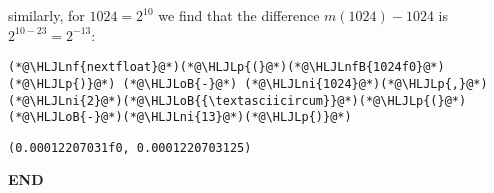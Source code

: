 \documentclass[12pt,a4paper]{article}
\newcommand{\HLJLnf}[1]{\textcolor[RGB]{66,102,213}{#1}}
\newcommand{\HLJLnfB}[1]{\textcolor[RGB]{59,151,46}{#1}}
\newcommand{\HLJLni}[1]{\textcolor[RGB]{59,151,46}{#1}}
\newcommand{\HLJLoB}[1]{\textcolor[RGB]{102,102,102}{\textbf{#1}}}
\newcommand{\HLJLp}[1]{#1}
\begin{document}
similarly, for $1024 = 2^{10}$ we find that the difference $m(1024) - 1024$ is $2^{10-23} = 2^{-13}$:


\begin{lstlisting}
(*@\HLJLnf{nextfloat}@*)(*@\HLJLp{(}@*)(*@\HLJLnfB{1024f0}@*)(*@\HLJLp{)}@*) (*@\HLJLoB{-}@*) (*@\HLJLni{1024}@*)(*@\HLJLp{,}@*) (*@\HLJLni{2}@*)(*@\HLJLoB{{\textasciicircum}}@*)(*@\HLJLp{(}@*)(*@\HLJLoB{-}@*)(*@\HLJLni{13}@*)(*@\HLJLp{)}@*)
\end{lstlisting}

\begin{lstlisting}
(0.00012207031f0, 0.0001220703125)
\end{lstlisting}


\textbf{END}
\end{document}
